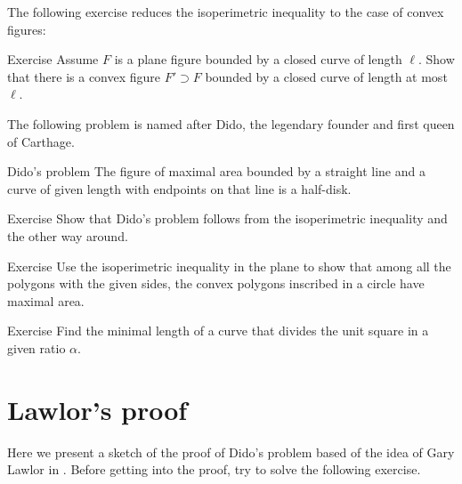 The following exercise reduces the isoperimetric inequality to the case of convex figures:



\begin{thm}{Exercise}
Assume $F$ is a plane figure bounded by a closed curve of length $\ell$.
Show that there is a convex figure $F'\supset F$ bounded by a closed curve of length at most $\ell$.
\end{thm}



The following problem is named after Dido, the legendary founder and first queen of Carthage.



\begin{thm}{Dido's problem}
The figure of maximal area bounded by a straight line and a curve of given length with endpoints on that line is a half-disk.
\end{thm}



\begin{thm}{Exercise}\label{ex:dido-isop}
Show that Dido's problem follows from the isoperimetric inequality and the other way around.
\end{thm}





\begin{thm}{Exercise}
Use the isoperimetric inequality in the plane to show that 
among all the polygons with the given sides,
the convex polygons inscribed in a circle have maximal area.
\end{thm}



\begin{thm}{Exercise}
Find the minimal length of a curve that divides the unit square in a given ratio $\alpha$.  
\end{thm}



\section{Lawlor's proof}



Here we present a sketch of the proof of Dido's problem based of the idea of Gary Lawlor in \cite{lawlor}.
Before getting into the proof, try to solve the following exercise.




